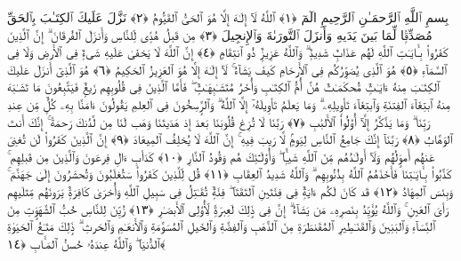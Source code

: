 
  
    
  
    
    

\nopagebreak
  بِسمِ ٱللَّهِ ٱلرَّحمَـٰنِ ٱلرَّحِيمِ
  الٓمٓ ﴿١﴾
 ٱللَّهُ لَآ إِلَـٰهَ إِلَّا هُوَ ٱلحَىُّ ٱلقَيُّومُ ﴿٢﴾
 نَزَّلَ عَلَيكَ ٱلكِتَـٰبَ بِٱلحَقِّ مُصَدِّقًۭا لِّمَا بَينَ يَدَيهِ وَأَنزَلَ ٱلتَّورَىٰةَ وَٱلإِنجِيلَ ﴿٣﴾
 مِن قَبلُ هُدًۭى لِّلنَّاسِ وَأَنزَلَ ٱلفُرقَانَ ۗ إِنَّ ٱلَّذِينَ كَفَرُوا۟ بِـَٔايَـٰتِ ٱللَّهِ لَهُم عَذَابٌۭ شَدِيدٌۭ ۗ وَٱللَّهُ عَزِيزٌۭ ذُو ٱنتِقَامٍ ﴿٤﴾
 إِنَّ ٱللَّهَ لَا يَخفَىٰ عَلَيهِ شَىءٌۭ فِى ٱلأَرضِ وَلَا فِى ٱلسَّمَآءِ ﴿٥﴾
 هُوَ ٱلَّذِى يُصَوِّرُكُم فِى ٱلأَرحَامِ كَيفَ يَشَآءُ ۚ لَآ إِلَـٰهَ إِلَّا هُوَ ٱلعَزِيزُ ٱلحَكِيمُ ﴿٦﴾
 هُوَ ٱلَّذِىٓ أَنزَلَ عَلَيكَ ٱلكِتَـٰبَ مِنهُ ءَايَـٰتٌۭ مُّحكَمَـٰتٌ هُنَّ أُمُّ ٱلكِتَـٰبِ وَأُخَرُ مُتَشَـٰبِهَـٰتٌۭ ۖ فَأَمَّا ٱلَّذِينَ فِى قُلُوبِهِم زَيغٌۭ فَيَتَّبِعُونَ مَا تَشَـٰبَهَ مِنهُ ٱبتِغَآءَ ٱلفِتنَةِ وَٱبتِغَآءَ تَأوِيلِهِۦ ۗ وَمَا يَعلَمُ تَأوِيلَهُۥٓ إِلَّا ٱللَّهُ ۗ وَٱلرَّٟسِخُونَ فِى ٱلعِلمِ يَقُولُونَ ءَامَنَّا بِهِۦ كُلٌّۭ مِّن عِندِ رَبِّنَا ۗ وَمَا يَذَّكَّرُ إِلَّآ أُو۟لُوا۟ ٱلأَلبَٰبِ ﴿٧﴾
 رَبَّنَا لَا تُزِغ قُلُوبَنَا بَعدَ إِذ هَدَيتَنَا وَهَب لَنَا مِن لَّدُنكَ رَحمَةً ۚ إِنَّكَ أَنتَ ٱلوَهَّابُ ﴿٨﴾
 رَبَّنَآ إِنَّكَ جَامِعُ ٱلنَّاسِ لِيَومٍۢ لَّا رَيبَ فِيهِ ۚ إِنَّ ٱللَّهَ لَا يُخلِفُ ٱلمِيعَادَ ﴿٩﴾
 إِنَّ ٱلَّذِينَ كَفَرُوا۟ لَن تُغنِىَ عَنهُم أَموَٟلُهُم وَلَآ أَولَـٰدُهُم مِّنَ ٱللَّهِ شَيـًۭٔا ۖ وَأُو۟لَـٰٓئِكَ هُم وَقُودُ ٱلنَّارِ ﴿١٠﴾
 كَدَأبِ ءَالِ فِرعَونَ وَٱلَّذِينَ مِن قَبلِهِم ۚ كَذَّبُوا۟ بِـَٔايَـٰتِنَا فَأَخَذَهُمُ ٱللَّهُ بِذُنُوبِهِم ۗ وَٱللَّهُ شَدِيدُ ٱلعِقَابِ ﴿١١﴾
 قُل لِّلَّذِينَ كَفَرُوا۟ سَتُغلَبُونَ وَتُحشَرُونَ إِلَىٰ جَهَنَّمَ ۚ وَبِئسَ ٱلمِهَادُ ﴿١٢﴾
 قَد كَانَ لَكُم ءَايَةٌۭ فِى فِئَتَينِ ٱلتَقَتَا ۖ فِئَةٌۭ تُقَـٰتِلُ فِى سَبِيلِ ٱللَّهِ وَأُخرَىٰ كَافِرَةٌۭ يَرَونَهُم مِّثلَيهِم رَأىَ ٱلعَينِ ۚ وَٱللَّهُ يُؤَيِّدُ بِنَصرِهِۦ مَن يَشَآءُ ۗ إِنَّ فِى ذَٟلِكَ لَعِبرَةًۭ لِّأُو۟لِى ٱلأَبصَـٰرِ ﴿١٣﴾
 زُيِّنَ لِلنَّاسِ حُبُّ ٱلشَّهَوَٟتِ مِنَ ٱلنِّسَآءِ وَٱلبَنِينَ وَٱلقَنَـٰطِيرِ ٱلمُقَنطَرَةِ مِنَ ٱلذَّهَبِ وَٱلفِضَّةِ وَٱلخَيلِ ٱلمُسَوَّمَةِ وَٱلأَنعَـٰمِ وَٱلحَرثِ ۗ ذَٟلِكَ مَتَـٰعُ ٱلحَيَوٰةِ ٱلدُّنيَا ۖ وَٱللَّهُ عِندَهُۥ حُسنُ ٱلمَـَٔابِ ﴿١٤﴾
